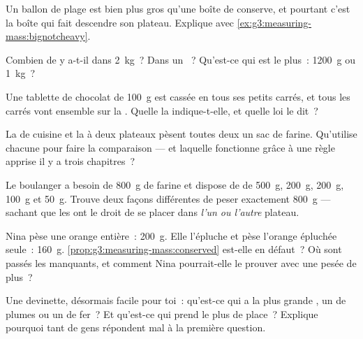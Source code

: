 \begin{exercise}[$\star$]\label{exo:g3:measuring-mass:5}
Un ballon de plage est bien plus gros qu'une boîte de conserve, et
pourtant c'est la boîte qui fait descendre son plateau. Explique avec
\cref{ex:g3:measuring-mass:bignotcheavy}.
\end{exercise}

\begin{exercise}[$\star$]\label{exo:g3:measuring-mass:6}
Combien de  y a-t-il dans \qty{2}{kg}~? Dans un ~?
Qu'est-ce qui est le plus~: \qty{1200}{g} ou \qty{1}{kg}~?
\end{exercise}

\begin{exercise}[$\star$]\label{exo:g3:measuring-mass:7}
Une tablette de chocolat de \qty{100}{g} est cassée en tous ses
petits carrés, et tous les carrés vont ensemble sur la .
Quelle  la  indique-t-elle, et quelle loi le dit~?
\end{exercise}

\begin{exercise}[$\star$]\label{exo:g3:measuring-mass:8}
La  de cuisine et la  à deux plateaux pèsent toutes
deux un sac de farine. Qu'utilise chacune pour faire la
comparaison --- et laquelle fonctionne grâce à une règle apprise il y
a trois chapitres~?
\end{exercise}

\begin{exercise}[$\star$]\label{exo:g3:measuring-mass:9}
Le boulanger a besoin de \qty{800}{g} de farine et dispose de 
de \qty{500}{g}, \qty{200}{g}, \qty{200}{g}, \qty{100}{g} et
\qty{50}{g}. Trouve deux façons différentes de peser exactement
\qty{800}{g} --- sachant que les  ont le droit de se placer
dans \emph{l'un ou l'autre} plateau.
\end{exercise}

\begin{exercise}[$\star\star$]\label{exo:g3:measuring-mass:10}
Nina pèse une orange entière~: \qty{200}{g}. Elle l'épluche et pèse
l'orange épluchée seule~: \qty{160}{g}.
\cref{prop:g3:measuring-mass:conserved} est-elle en défaut~? Où sont
passés les  manquants, et comment Nina pourrait-elle le
prouver avec une pesée de plus~?
\end{exercise}

\begin{exercise}[$\star\star$]\label{exo:g3:measuring-mass:11}
Une devinette, désormais facile pour toi~: qu'est-ce qui a la plus
grande , un  de plumes ou un  de fer~? Et
qu'est-ce qui prend le plus de place~? Explique pourquoi tant de gens
répondent mal à la première question.
\end{exercise}

